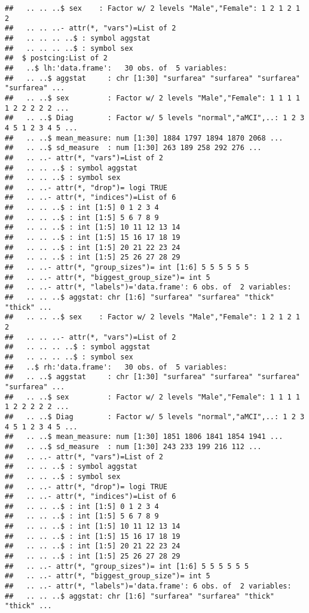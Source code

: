 \documentclass[12pt]{article}
\begin{document}
\begin{knitrout}
\begin{kframe}
\begin{verbatim}
##   .. .. ..$ sex    : Factor w/ 2 levels "Male","Female": 1 2 1 2 1 2
##   .. .. ..- attr(*, "vars")=List of 2
##   .. .. .. ..$ : symbol aggstat
##   .. .. .. ..$ : symbol sex
##  $ postcing:List of 2
##   ..$ lh:'data.frame':	30 obs. of  5 variables:
##   .. ..$ aggstat     : chr [1:30] "surfarea" "surfarea" "surfarea" "surfarea" ...
##   .. ..$ sex         : Factor w/ 2 levels "Male","Female": 1 1 1 1 1 2 2 2 2 2 ...
##   .. ..$ Diag        : Factor w/ 5 levels "normal","aMCI",..: 1 2 3 4 5 1 2 3 4 5 ...
##   .. ..$ mean_measure: num [1:30] 1884 1797 1894 1870 2068 ...
##   .. ..$ sd_measure  : num [1:30] 263 189 258 292 276 ...
##   .. ..- attr(*, "vars")=List of 2
##   .. .. ..$ : symbol aggstat
##   .. .. ..$ : symbol sex
##   .. ..- attr(*, "drop")= logi TRUE
##   .. ..- attr(*, "indices")=List of 6
##   .. .. ..$ : int [1:5] 0 1 2 3 4
##   .. .. ..$ : int [1:5] 5 6 7 8 9
##   .. .. ..$ : int [1:5] 10 11 12 13 14
##   .. .. ..$ : int [1:5] 15 16 17 18 19
##   .. .. ..$ : int [1:5] 20 21 22 23 24
##   .. .. ..$ : int [1:5] 25 26 27 28 29
##   .. ..- attr(*, "group_sizes")= int [1:6] 5 5 5 5 5 5
##   .. ..- attr(*, "biggest_group_size")= int 5
##   .. ..- attr(*, "labels")='data.frame':	6 obs. of  2 variables:
##   .. .. ..$ aggstat: chr [1:6] "surfarea" "surfarea" "thick" "thick" ...
##   .. .. ..$ sex    : Factor w/ 2 levels "Male","Female": 1 2 1 2 1 2
##   .. .. ..- attr(*, "vars")=List of 2
##   .. .. .. ..$ : symbol aggstat
##   .. .. .. ..$ : symbol sex
##   ..$ rh:'data.frame':	30 obs. of  5 variables:
##   .. ..$ aggstat     : chr [1:30] "surfarea" "surfarea" "surfarea" "surfarea" ...
##   .. ..$ sex         : Factor w/ 2 levels "Male","Female": 1 1 1 1 1 2 2 2 2 2 ...
##   .. ..$ Diag        : Factor w/ 5 levels "normal","aMCI",..: 1 2 3 4 5 1 2 3 4 5 ...
##   .. ..$ mean_measure: num [1:30] 1851 1806 1841 1854 1941 ...
##   .. ..$ sd_measure  : num [1:30] 243 233 199 216 112 ...
##   .. ..- attr(*, "vars")=List of 2
##   .. .. ..$ : symbol aggstat
##   .. .. ..$ : symbol sex
##   .. ..- attr(*, "drop")= logi TRUE
##   .. ..- attr(*, "indices")=List of 6
##   .. .. ..$ : int [1:5] 0 1 2 3 4
##   .. .. ..$ : int [1:5] 5 6 7 8 9
##   .. .. ..$ : int [1:5] 10 11 12 13 14
##   .. .. ..$ : int [1:5] 15 16 17 18 19
##   .. .. ..$ : int [1:5] 20 21 22 23 24
##   .. .. ..$ : int [1:5] 25 26 27 28 29
##   .. ..- attr(*, "group_sizes")= int [1:6] 5 5 5 5 5 5
##   .. ..- attr(*, "biggest_group_size")= int 5
##   .. ..- attr(*, "labels")='data.frame':	6 obs. of  2 variables:
##   .. .. ..$ aggstat: chr [1:6] "surfarea" "surfarea" "thick" "thick" ...

\end{verbatim}
\end{kframe}
\end{knitrout}
\end{document}
